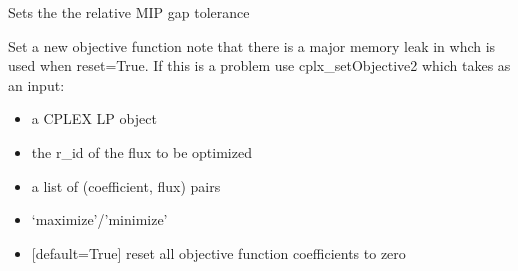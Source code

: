 \documentclass[letterpaper,10pt,english]{sphinxmanual}
\begin{document}

\begin{fulllineitems}
\label{\detokenize{modules_doc:cbmpy.CBCPLEX.cplx_setMIPGapTolerance}}
\pysigstartsignatures
{}
\pysigstopsignatures
\sphinxAtStartPar
Sets the the relative MIP gap tolerance

\end{fulllineitems}


\begin{fulllineitems}
\label{\detokenize{modules_doc:cbmpy.CBCPLEX.cplx_setObjective}}
\pysigstartsignatures
{}
\pysigstopsignatures
\sphinxAtStartPar
Set a new objective function note that there is a major memory leak in
 whch is used when reset=True. If this is a problem
use cplx\_setObjective2 which takes  as an input:
\begin{itemize}
\item {} 
\sphinxAtStartPar
{} a CPLEX LP object

\item {} 
\sphinxAtStartPar
{} the r\_id of the flux to be optimized

\item {} 
\sphinxAtStartPar
{} a list of (coefficient, flux) pairs

\item {} 
\sphinxAtStartPar
{} ‘maximize’/’minimize’

\item {} 
\sphinxAtStartPar
{} {[}default=True{]} reset all objective function coefficients to zero

\end{itemize}

\end{fulllineitems}
\end{document}
